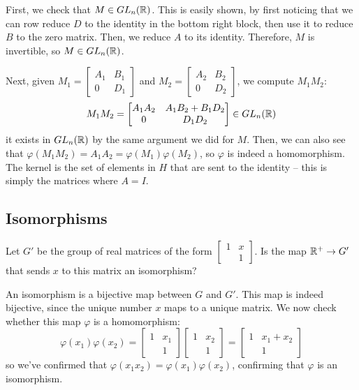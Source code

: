 \documentclass[10pt]{article}
\begin{document}
\begin{solution}
	First, we check that \( M \in GL_n(\mathbb R) \). This is easily shown, by first 
	noticing that we can row reduce \( D \) to the identity in the bottom right block, 
	then use it to reduce \( B \) to the zero matrix. Then, we reduce \( A \) to its 
	identity. Therefore, \( M \) is invertible, so \( M \in GL_n(\mathbb R) \). 

	Next, given \( M_1 = \begin{bmatrix} A_1 & B_1 \\ 0 & D_1 \end{bmatrix}  \) 
	and \( M_2 = \begin{bmatrix} A_2 & B_2\\ 0 & D_2\end{bmatrix}  \), 
	we compute \( M_1M_2 \):
	\[
		M_1M_2 = \begin{bmatrix} A_1A_2 & A_1 B_2 + B_1D_2\\0 & D_1D_2 \end{bmatrix}
		\in GL_n(\mathbb R)
	\] 
	it exists in \( GL_n(\mathbb R) \) by the same argument we did for \( M \). 
	Then, we can also see that \( \varphi(M_1M_2) = A_1A_2 = 
	\varphi(M_1) \varphi(M_2) \), so \( \varphi \) is indeed a homomorphism. The 
	kernel is the set of elements in \( H \) that are sent to the 
	identity -- this is simply the matrices where \( A = I \).   
\end{solution}

\subsection{Isomorphisms}
\begin{problem}
	Let \( G' \) be the group of real matrices of the form 
	\( \begin{bmatrix} 1 & x \\  & 1 \end{bmatrix}  \). Is the map 
	\( \mathbb R^{+} \to G' \) that sends \( x \) to this matrix an isomorphism?
\end{problem}

\begin{solution}
	An isomorphism is a bijective map between \( G \) and \( G' \). This map 
	is indeed bijective, since the unique number \( x \) maps to a unique matrix. We 
	now check whether this map \( \varphi \) is a homomorphism:
	\[
		\varphi(x_1) \varphi(x_2) = \begin{bmatrix} 1 & x_1 \\ & 1 \end{bmatrix} 
		\begin{bmatrix} 1 & x_2 \\ & 1 \end{bmatrix}  = 
		\begin{bmatrix} 1 & x_1 + x_2\\ & 1 \end{bmatrix} 
	\] 
	so we've confirmed that \( \varphi(x_1x_2) = \varphi(x_1) \varphi(x_2) \), 
	confirming that \( \varphi \) is an isomorphism. 
\end{solution}
\end{document}

